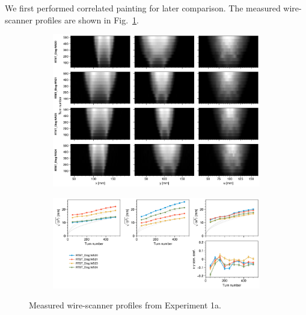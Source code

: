 We first performed correlated painting for later comparison. The measured wire-scanner profiles are shown in Fig.~\ref{fig:exp1a_wsmeas}.
%
\begin{figure}[!p]
    \centering
    \begin{subfigure}{\textwidth}
        \includegraphics[width=\textwidth]{Images/chapter5/exp1a/waterfall.png}
    \end{subfigure}
    \vfill
    \vspace*{1.25cm}
    \vfill
    \begin{subfigure}{\textwidth}
        \includegraphics[width=\textwidth]{Images/chapter5/exp1a/rms.png}
    \end{subfigure}
    \caption{Measured wire-scanner profiles from Experiment 1a.}
    \label{fig:exp1a_wsmeas}
\end{figure}
%
%
